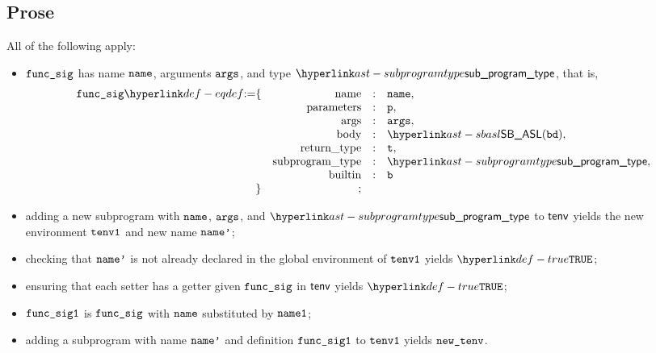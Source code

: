 \subsection{Prose}
All of the following apply:
\begin{itemize}
  \item $\texttt{func\_sig}$ has name $\texttt{name}$, arguments $\texttt{args}$, and type $\subprogramtype$, that is,
  \[
    \begin{array}{rrcl}
      \funcsig \eqdef \{
                      & \funcname            &:& \name,\\
                      & \funcparameters      &:& \vp,\\
                      & \funcargs            &:& \vargs,\\
                      & \funcbody            &:& \SBASL(\bd),\\
                      & \funcreturntype      &:& \vt,\\
                      & \funcsubprogramtype  &:& \subprogramtype, \\
                      & \funcbuiltin         &:& \vb \\
                  \}  & ; &&
        \end{array}
  \]
  \item adding a new subprogram with $\texttt{name}$, $\texttt{args}$, and $\subprogramtype$ to $\textsf{tenv}$ yields the new
        environment $\texttt{tenv1}$ and new name $\texttt{name'}$\ProseOrTypeError;
  \item checking that $\texttt{name'}$ is not already declared in the global environment of $\texttt{tenv1}$
        yields $\True$\ProseOrTypeError;
  \item ensuring that each setter has a getter given $\texttt{func\_sig}$ in $\textsf{tenv}$ yields $\True$\ProseOrTypeError;
  \item $\texttt{func\_sig1}$ is $\texttt{func\_sig}$ with $\texttt{name}$ substituted by $\texttt{name1}$;
  \item adding a subprogram with name $\texttt{name'}$ and definition $\texttt{func\_sig1}$ to $\texttt{tenv1}$ yields $\texttt{new\_tenv}$\ProseOrTypeError.
\end{itemize}

